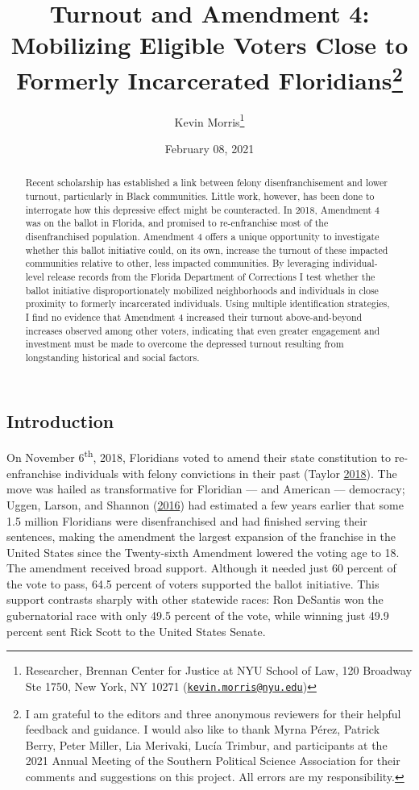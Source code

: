 \documentclass[
  12pt,
]{article}
\title{Turnout and Amendment 4: Mobilizing Eligible Voters Close to Formerly Incarcerated Floridians\thanks{I am grateful to the editors and three anonymous reviewers for their helpful feedback and guidance. I would also like to thank Myrna Pérez, Patrick Berry, Peter Miller, Lia Merivaki, Lucía Trimbur, and participants at the 2021 Annual Meeting of the Southern Political Science Association for their comments and suggestions on this project. All errors are my responsibility.}}
\author{Kevin Morris\footnote{Researcher, Brennan Center for Justice at NYU School of Law, 120 Broadway Ste 1750, New York, NY 10271 (\href{mailto:kevin.morris@nyu.edu}{\nolinkurl{kevin.morris@nyu.edu}})}}
\date{February 08, 2021}
\begin{document}
\maketitle
\begin{abstract}
Recent scholarship has established a link between felony disenfranchisement and lower turnout, particularly in Black communities. Little work, however, has been done to interrogate how this depressive effect might be counteracted. In 2018, Amendment 4 was on the ballot in Florida, and promised to re-enfranchise most of the disenfranchised population. Amendment 4 offers a unique opportunity to investigate whether this ballot initiative could, on its own, increase the turnout of these impacted communities relative to other, less impacted communities. By leveraging individual-level release records from the Florida Department of Corrections I test whether the ballot initiative disproportionately mobilized neighborhoods and individuals in close proximity to formerly incarcerated individuals. Using multiple identification strategies, I find no evidence that Amendment 4 increased their turnout above-and-beyond increases observed among other voters, indicating that even greater engagement and investment must be made to overcome the depressed turnout resulting from longstanding historical and social factors.
\end{abstract}

\pagebreak

\doublespacing

\hypertarget{introduction}{%
\subsection*{Introduction}\label{introduction}}

On November 6\textsuperscript{th}, 2018, Floridians voted to amend their state constitution to re-enfranchise individuals with felony convictions in their past (Taylor \protect\hyperlink{ref-Taylor2018}{2018}). The move was hailed as transformative for Floridian --- and American --- democracy; Uggen, Larson, and Shannon (\protect\hyperlink{ref-sentencing_2016}{2016}) had estimated a few years earlier that some 1.5 million Floridians were disenfranchised and had finished serving their sentences, making the amendment the largest expansion of the franchise in the United States since the Twenty-sixth Amendment lowered the voting age to 18. The amendment received broad support. Although it needed just 60 percent of the vote to pass, 64.5 percent of voters supported the ballot initiative. This support contrasts sharply with other statewide races: Ron DeSantis won the gubernatorial race with only 49.5 percent of the vote, while winning just 49.9 percent sent Rick Scott to the United States Senate.
\end{document}
